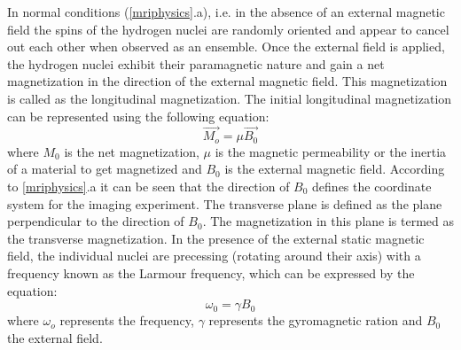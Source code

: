 \documentclass[msthesis.tex]{subfiles}
\begin{document}
In normal conditions (\cref{mriphysics}.a), i.e. in the absence of an external magnetic field the spins of the hydrogen nuclei are randomly oriented and appear to cancel out each other when observed as an ensemble. Once the external field is applied, the hydrogen nuclei exhibit their paramagnetic nature and gain a net magnetization in the direction of the external magnetic field. This magnetization is called as the longitudinal magnetization. The initial longitudinal magnetization can be represented using the following equation:
\begin{equation}
       \Vec{M_o} = \mu \Vec{B_0}
\end{equation}
where $M_0$ is the net magnetization, $\mu$ is the magnetic permeability or the inertia of a material to get magnetized and $B_0$ is the external magnetic field. According to \cref{mriphysics}.a it can be seen that the direction of $B_0$ defines the coordinate system for the imaging experiment. The transverse plane is defined as the plane perpendicular to the direction of $B_0$. The magnetization in this plane is termed as the transverse magnetization. In the presence of the external static magnetic field, the individual nuclei are precessing (rotating around their axis) with a frequency known as the Larmour frequency, which can be expressed by the equation:
\begin{equation}
    \omega_0 = \gamma B_0
    \label{larmour}
\end{equation}
where $\omega_o$ represents the frequency, $\gamma$ represents the gyromagnetic ration and $B_0$ the external field.
\end{document}

